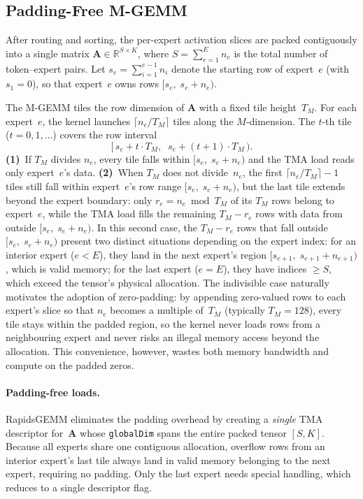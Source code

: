 \documentclass[11pt,a4paper]{article}
\theoremstyle{definition}
\begin{document}
\subsection{Padding-Free M-GEMM}
After routing and sorting, the per-expert activation slices are packed
contiguously into a single matrix
$\mathbf{A} \in \mathbb{R}^{S \times K}$, where $S = \sum_{e=1}^{E} n_e$
is the total number of token--expert pairs. Let $s_e = \sum_{i=1}^{e-1} n_i$
denote the starting row of expert~$e$ (with $s_1 = 0$), so that
expert~$e$ owns rows $[s_e,\; s_e + n_e)$.

The M-GEMM tiles the row dimension of $\mathbf{A}$ with a fixed tile
height~$T_M$. For each expert~$e$, the kernel launches
$\lceil n_e / T_M \rceil$ tiles along the $M$-dimension. The $t$-th
tile ($t = 0, 1, \dots$) covers the row interval
\begin{equation}
  \bigl[\,s_e + t \cdot T_M,\;\; s_e + (t+1) \cdot T_M\,\bigr).
\label{eq:tile-interval}
\end{equation}
\textbf{(1)}~If $T_M$ divides $n_e$, every tile falls within
$[s_e,\; s_e + n_e)$ and the TMA load reads only expert~$e$'s data.
\textbf{(2)}~When $T_M$ does not divide~$n_e$, the first
$\lceil n_e / T_M \rceil - 1$ tiles still fall within expert~$e$'s
row range $[s_e,\; s_e + n_e)$, but the last tile extends beyond
the expert boundary:
only $r_e = n_e \bmod T_M$ of its $T_M$ rows belong to expert~$e$,
while the TMA load fills the remaining $T_M - r_e$ rows with data
from outside $[s_e,\; s_e + n_e)$.
In this second case, the $T_M - r_e$ rows that fall outside
$[s_e,\; s_e + n_e)$ present two distinct situations depending on
the expert index:
for an interior expert ($e < E$), they land in the next expert's
region $[s_{e+1},\; s_{e+1} + n_{e+1})$, which is valid memory;
for the last expert ($e = E$), they have indices $\geq S$, which
exceed the tensor's physical allocation.
The indivisible case naturally motivates the adoption of zero-padding:
by appending zero-valued rows to each expert's slice so that $n_e$
becomes a multiple of~$T_M$ (typically $T_M = 128$), every tile stays
within the padded region, so the kernel never loads rows from a
neighbouring expert and never risks an illegal memory access beyond
the allocation. This convenience, however, wastes both memory
bandwidth and compute on the padded zeros.

\paragraph{Padding-free loads.}
RapidsGEMM eliminates the padding overhead by creating a \emph{single}
TMA descriptor for~$\mathbf{A}$ whose \texttt{globalDim} spans the
entire packed tensor $[S, K]$. Because all experts share one
contiguous allocation, overflow rows from an interior expert's last
tile always land in valid memory belonging to the next expert,
requiring no padding. Only the last expert needs special handling,
which reduces to a single descriptor flag.
\end{document}
